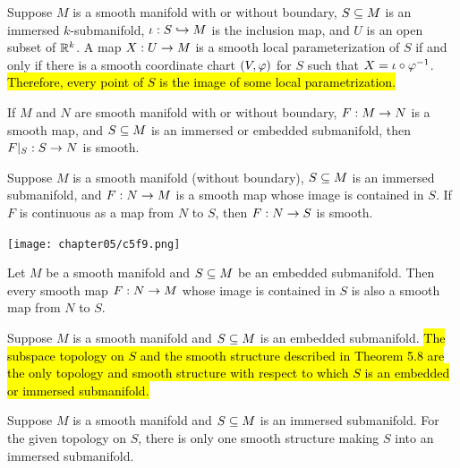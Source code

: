 \begin{prop}
Suppose $M$ is a smooth manifold with or without boundary, $S\subseteq M$ is an immersed $k$-submanifold, $\iota:S\hookrightarrow M$ is the inclusion map, and $U$ is an open subset of $\mathbb{R}^k$. A map $X:U\rightarrow M$ is a smooth local parameterization of $S$ if and only if there is a smooth coordinate chart $(V,\varphi)$ for $S$ such that $X = \iota\circ\varphi^{-1}$. \hl{Therefore, every point of $S$ is the image of some local parametrization.}
\end{prop}

\setcounter{thm}{26}

\begin{thm}
If $M$ and $N$ are smooth manifold with or without boundary, $F:M\rightarrow N$ is a smooth map, and $S\subseteq M$ is an immersed or embedded submanifold, then $F|_S:S\rightarrow N$ is smooth.
\end{thm}

\setcounter{thm}{28}

\begin{thm}
Suppose $M$ is a smooth manifold (without boundary), $S\subseteq M$ is an immersed submanifold, and $F:N\rightarrow M$ is a smooth map whose image is contained in $S$. If $F$ is continuous as a map from $N$ to $S$, then $F:N\rightarrow S$ is smooth.
\end{thm}

\begin{center}
    \texttt{[image: chapter05/c5f9.png]}
\end{center}

\begin{cor}
Let $M$ be a smooth manifold and $S\subseteq M$ be an embedded submanifold. Then every smooth map $F:N\rightarrow M$ whose image is contained in $S$ is also a smooth map from $N$ to $S$.
\end{cor}

\begin{thm}
Suppose $M$ is a smooth manifold and $S\subseteq M$ is an embedded submanifold. \hl{The subspace topology on $S$ and the smooth structure described in Theorem 5.8 are the only topology and smooth structure with respect to which $S$ is an embedded or immersed submanifold.}
\end{thm}

\begin{thm}
Suppose $M$ is a smooth manifold and $S\subseteq M$ is an immersed submanifold. For the given topology on $S$, there is only one smooth structure making $S$ into an immersed submanifold.
\end{thm}

